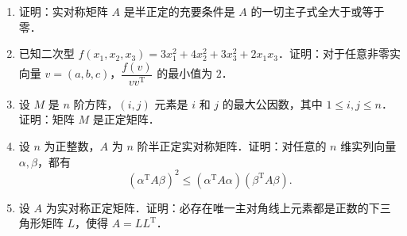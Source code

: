 \begin{enumerate}
\begin{enumerate}
    \[
      |A|\leqslant a_{11}a_{22}\cdots a_{nn};
    \]
  \anssub
    \item 如果 $T=(t_{ij})_{n\times n}$ 是实可逆矩阵，那么
    \[
      |T|^2\leqslant\prod_{i=1}^{n}(t_{i1}^2+t_{i2}^2+\cdots+t_{in}^2).
    \]
  \anssub
  \end{enumerate}
  \item 证明：实对称矩阵 $A$ 是半正定的充要条件是 $A$ 的一切主子式全大于或等于零．
  \ansproof
  \item 已知二次型 $f(x_1,x_2,x_3)=3x_1^2+4x_2^2+3x_3^2+2x_1x_3$．证明：对于任意非零实向量 $v=(a,b,c)$，$\dfrac{f(v)}{vv^{\mathrm{T}}}$ 的最小值为 $2$．
  \ansproof
  \item 设 $M$ 是 $n$ 阶方阵，$(i,j)$ 元素是 $i$ 和 $j$ 的最大公因数，其中 $1\leqslant i,j\leqslant n$．证明：矩阵 $M$ 是正定矩阵．
  \ansproof
  \item 设 $n$ 为正整数，$A$ 为 $n$ 阶半正定实对称矩阵．证明：对任意的 $n$ 维实列向量 $\alpha,\beta$，都有
  \[
    (\alpha^{\mathrm{T}}A\beta)^2\leqslant(\alpha^{\mathrm{T}}A\alpha)(\beta^{\mathrm{T}}A\beta).
  \]
  \ansproof
  \item 设 $A$ 为实对称正定矩阵．证明：必存在唯一主对角线上元素都是正数的下三角形矩阵 $L$，使得 $A=LL^{\mathrm{T}}$．
  \ansproof
\end{enumerate}

